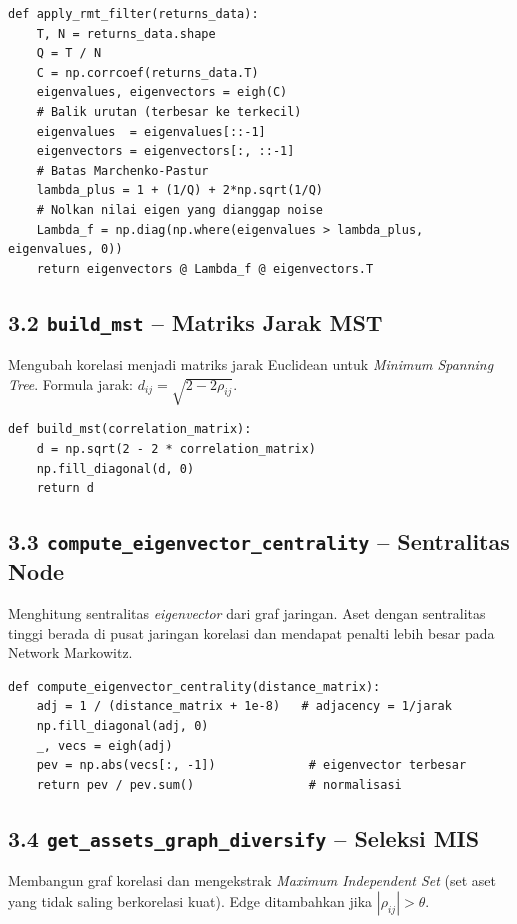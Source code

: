 \documentclass[12pt,a4paper]{article}
\begin{document}
\begin{lstlisting}[caption={\texttt{apply\_rmt\_filter}}]
def apply_rmt_filter(returns_data):
    T, N = returns_data.shape
    Q = T / N
    C = np.corrcoef(returns_data.T)
    eigenvalues, eigenvectors = eigh(C)
    # Balik urutan (terbesar ke terkecil)
    eigenvalues  = eigenvalues[::-1]
    eigenvectors = eigenvectors[:, ::-1]
    # Batas Marchenko-Pastur
    lambda_plus = 1 + (1/Q) + 2*np.sqrt(1/Q)
    # Nolkan nilai eigen yang dianggap noise
    Lambda_f = np.diag(np.where(eigenvalues > lambda_plus, eigenvalues, 0))
    return eigenvectors @ Lambda_f @ eigenvectors.T
\end{lstlisting}

\subsection{3.2 \texttt{build\_mst} -- Matriks Jarak MST}
Mengubah korelasi menjadi matriks jarak Euclidean untuk \textit{Minimum Spanning Tree}.
Formula jarak: $d_{ij} = \sqrt{2 - 2\rho_{ij}}$.

\begin{lstlisting}[caption={\texttt{build\_mst}}]
def build_mst(correlation_matrix):
    d = np.sqrt(2 - 2 * correlation_matrix)
    np.fill_diagonal(d, 0)
    return d
\end{lstlisting}

\subsection{3.3 \texttt{compute\_eigenvector\_centrality} -- Sentralitas Node}
Menghitung sentralitas \textit{eigenvector} dari graf jaringan. Aset dengan sentralitas
tinggi berada di pusat jaringan korelasi dan mendapat penalti lebih besar pada
Network Markowitz.

\begin{lstlisting}[caption={\texttt{compute\_eigenvector\_centrality}}]
def compute_eigenvector_centrality(distance_matrix):
    adj = 1 / (distance_matrix + 1e-8)   # adjacency = 1/jarak
    np.fill_diagonal(adj, 0)
    _, vecs = eigh(adj)
    pev = np.abs(vecs[:, -1])             # eigenvector terbesar
    return pev / pev.sum()                # normalisasi
\end{lstlisting}

\subsection{3.4 \texttt{get\_assets\_graph\_diversify} -- Seleksi MIS}
Membangun graf korelasi dan mengekstrak \textit{Maximum Independent Set} (set aset
yang tidak saling berkorelasi kuat). Edge ditambahkan jika $|\rho_{ij}| > \theta$.
\end{document}
